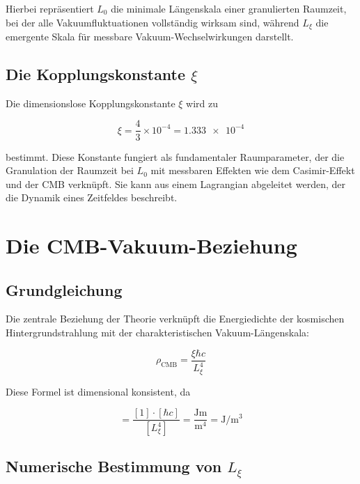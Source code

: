 \documentclass[12pt,a4paper]{article}
\begin{document}
	Hierbei repräsentiert \( L_0 \) die minimale Längenskala einer granulierten Raumzeit, bei der alle Vakuumfluktuationen vollständig wirksam sind, während \( L_\xi \) die emergente Skala für messbare Vakuum-Wechselwirkungen darstellt.
	
	\subsection{Die Kopplungskonstante \( \xi \)}
	
	Die dimensionslose Kopplungskonstante \( \xi \) wird zu
	
	\begin{equation}
		\xi = \frac{4}{3} \times 10^{-4} = \num{1.333e-4} \label{eq:coupling_constant}
	\end{equation}
	
	bestimmt. Diese Konstante fungiert als fundamentaler Raumparameter, der die Granulation der Raumzeit bei \( L_0 \) mit messbaren Effekten wie dem Casimir-Effekt und der CMB verknüpft. Sie kann aus einem Lagrangian abgeleitet werden, der die Dynamik eines Zeitfeldes beschreibt.
	
	\section{Die CMB-Vakuum-Beziehung}
	
	\subsection{Grundgleichung}
	
	Die zentrale Beziehung der Theorie verknüpft die Energiedichte der kosmischen Hintergrundstrahlung mit der charakteristischen Vakuum-Längenskala:
	
	\begin{equation}
		\rho_{\text{CMB}} = \frac{\xi \hbar c}{L_\xi^4} \label{eq:cmb_vacuum_relation}
	\end{equation}
	
	Diese Formel ist dimensional konsistent, da
	
	\begin{equation}
		[\rho_{\text{CMB}}] = \frac{[1] \cdot [\hbar c]}{[L_\xi^4]} = \frac{\si{\joule\meter}}{\si{\meter^4}} = \si{\joule\per\meter^3}
	\end{equation}
	
	\subsection{Numerische Bestimmung von \( L_\xi \)}
	
\end{document}
